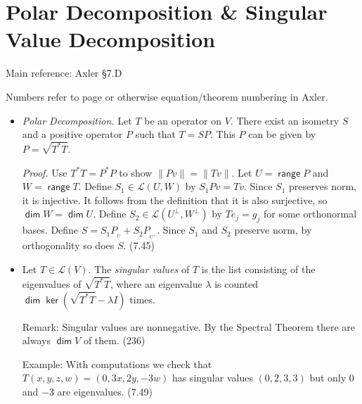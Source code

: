 \documentclass[11pt]{article}
\newcommand{\1}{\mathbf{1}}
\newcommand{\proj}[1]{P_{\!\!{}_{#1}}}
\newcommand{\0}{\mathbf{0}}
\newcommand{\cL}{\mathcal{L}}
\DeclareMathOperator{\myrange}{\mathsf{range}}
\DeclareMathOperator{\myker}{\mathsf{ker}}
\DeclareMathOperator{\mydim}{\mathsf{dim}}
\begin{document}
{\begin{itemize}
% 
% 

\end{itemize}


\clearpage
\section{Polar Decomposition \& Singular Value Decomposition}

Main reference:
Axler \S7.D

Numbers refer to page or otherwise equation/theorem numbering in Axler.

\begin{itemize}

\item

\emph{Polar Decomposition.}
Let $T$ be an operator on $V$.
There exist an isometry $S$ and a positive operator $P$ such that $T=SP$.
This $P$ can be given by $P=\sqrt{T^*T}$.

\emph{Proof.}
Use $T^*T=P^*P$ to show $\|Pv\|=\|Tv\|$.
Let $U=\myrange P$ and $W = \myrange T$.
Define $S_1 \in \cL(U,W)$ by $S_1 P v = T v$.
Since $S_1$ preserves norm, it is injective.
It follows from the definition that it is also surjective, so $\mydim W = \mydim U$.
Define $S_2 \in \cL(U^\perp,W^\perp)$ by $Te_j=g_j$ for some orthonormal bases.
Define $S = S_1 \proj{U} + S_2 \proj{U^\perp}$.
Since $S_1$ and $S_2$ preserve norm, by orthogonality so does $S$.
\hfill
(7.45)


\item

Let $T\in\mathcal{L}(V)$. The \emph{singular values} of $T$ is the list consisting of the eigenvalues of $\sqrt{T^*T}$, where an eigenvalue $\lambda$ is counted $\mydim \myker (\sqrt{T^*T}-\lambda I)$ times.

Remark:
Singular values are nonnegative. By the Spectral Theorem there are always $\mydim V$ of them.
\hfill
(236)

Example:
With computations we check that $T(x,y,z,w)=(0,3x,2y,-3w)$ has singular values $(0,2,3,3)$ but only $0$ and $-3$ are eigenvalues.
\hfill
(7.49)


\end{itemize}}
\end{document}
